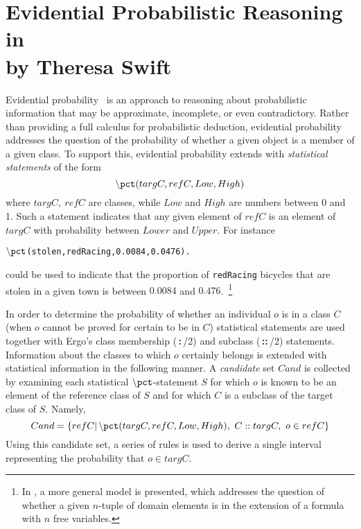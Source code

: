 \chapter[Evidential Probabilistic Reasoning in  \FLSYSTEM]
{Evidential Probabilistic Reasoning in  \FLSYSTEM\\
  {\Large by Theresa Swift}}

\newcommand{\pct}{{\ensuremath{\tt \backslash{}pct}}}
\newcommand{\isa}{\,{\bf{:}}\,}
\newcommand{\subcl}{\,{\bf{::}}\,}

Evidential probability~\cite{KybTen:2001} is an approach to reasoning
about probabilistic information that may be approximate, incomplete,
or even contradictory. Rather than providing a full calculus for
probabilistic deduction, evidential probability addresses the question
of the probability of whether a given object is a member of a given
class.  To support this, evidential probability extends 
\FLSYSTEM with {\em statistical statements} of
the form
\[
    \pct (targC,refC,Low,High)
\]
where $targC,~refC$ are \ERGO classes, while $Low$ and $High$ are
numbers between 0 and 1.  Such a statement indicates that any given
element of $refC$ is an element of $targC$ with probability between
$Lower$ and $Upper$.  For instance
\begin{center}
{\tt \pct(stolen,redRacing,0.0084,0.0476).}
\end{center}
could be used to indicate that the proportion of {\tt redRacing}
bicycles that are stolen in a given town is between $0.0084$ and
$0.476$.~\footnote{
  In \cite{KybTen:2001}, a more general model is
  presented, which addresses the question of whether a given $n$-tuple
  of domain elements is in the extension of a formula with $n$ free
  variables.}

In order to determine the probability of whether an individual $o$ is
in a class $C$ (when $o$ cannot be proved for certain to be in $C$)
statistical statements are used together with Ergo's class membership
(\isa/2) and subclass (\subcl/2) statements.  Information about the
classes to which $o$ certainly belongs is extended with statistical
information in the following manner.  A \emph{candidate} set $Cand$ is
collected by examining each statistical $\pct$-statement $S$ for which
$o$ is known to be an element of the reference class of $S$ and for
which $C$ is a subclass of the target class of $S$.  Namely,
\[
Cand = \{refC|\,\pct(targC,refC,Low,High),~C::targC,~o\in refC\}
\]
Using this candidate set, a series of rules is used to derive a single
interval representing the probability that $o \in targC$.  

